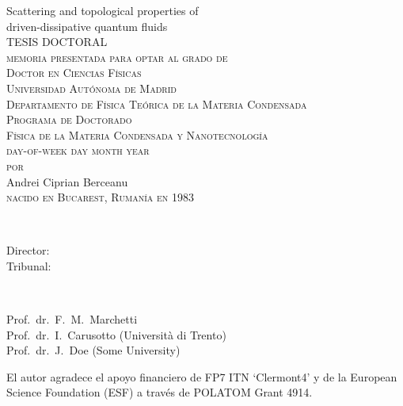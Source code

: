 \thispagestyle{empty}

\begin{center}
{\Huge  Scattering and topological properties of \\ driven-dissipative quantum fluids\\}
\vspace{5.4cm}
{\large{TESIS DOCTORAL}}\\
\vspace{2.6cm}
{ \textsc{memoria presentada para optar al grado de \\ Doctor en Ciencias F\'{i}sicas\\
Universidad Aut\'{o}noma de Madrid\\
Departamento de F\'{i}sica Te\'{o}rica de la Materia Condensada\\
Programa de Doctorado\\
F\'{i}sica de la Materia Condensada y Nanotecnolog\'{i}a\\
day-of-week day month year\\
$\,$\\$\,$\\por\\$\,$\\$\,$\\}
{\LARGE{Andrei Ciprian Berceanu}}\\$\,$ \\\textsc{nacido en Bucarest, Ruman\'{i}a en 1983}}
\end{center}
\newpage

\thispagestyle{empty}
\\[2ex]
  \parbox[t]{2.8cm}{Director:\\
                  Tribunal:
}~\parbox[t]{9cm}{Prof.\ dr.\ F.\ M.\ Marchetti \\
Prof.\ dr.\ I.\ Carusotto (Universit\`{a} di Trento) \\
Prof.\ dr.\ J.\ Doe (Some University)
}


\vfill


\noindent
\begin{otherlanguage}{spanish}
El autor agradece el apoyo financiero de FP7 ITN `Clermont4' y
de la European Science Foundation (ESF) a trav\'{e}s de POLATOM Grant 4914.
\end{otherlanguage}
\vspace{\baselineskip}


